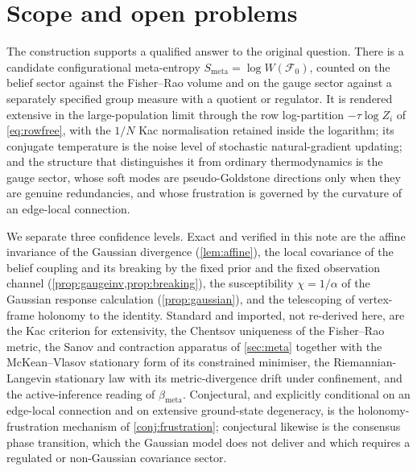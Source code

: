 \documentclass[11pt]{article}
\theoremstyle{plain}
\theoremstyle{definition}
\newcommand{\Fcal}{\mathcal{F}}
\newcommand{\Wmeta}{W}
\newcommand{\Smeta}{S_{\mathrm{meta}}}
\newcommand{\bmeta}{\beta_{\mathrm{meta}}}
\begin{document}
\section{Scope and open problems}
\label{sec:discussion}

The construction supports a qualified answer to the original question. There is a
candidate configurational meta-entropy $\Smeta=\log\Wmeta(\Fcal_0)$, counted on the
belief sector against the Fisher--Rao volume and on the gauge sector against a separately
specified group measure with a quotient or regulator. It is rendered extensive in the
large-population limit through the row log-partition $-\tau\log Z_i$ of \cref{eq:rowfree},
with the $1/N$ Kac normalisation retained inside the logarithm; its conjugate temperature
is the noise level of stochastic natural-gradient updating; and the structure that
distinguishes it from ordinary thermodynamics is the gauge sector, whose soft modes are
pseudo-Goldstone directions only when they are genuine redundancies, and whose frustration
is governed by the curvature of an edge-local connection.

We separate three confidence levels. Exact and verified in this note are the affine
invariance of the Gaussian divergence (\cref{lem:affine}), the local covariance of the
belief coupling and its breaking by the fixed prior and the fixed observation channel
(\cref{prop:gaugeinv,prop:breaking}), the susceptibility
$\chi=1/\alpha$ of the Gaussian response calculation (\cref{prop:gaussian}), and the
telescoping of vertex-frame holonomy to the identity. Standard and imported, not
re-derived here, are the Kac criterion for extensivity, the Chentsov uniqueness of the
Fisher--Rao metric, the Sanov and contraction apparatus of \cref{sec:meta} together with
the McKean--Vlasov stationary form of its constrained minimiser, the Riemannian-Langevin stationary law with its
metric-divergence drift under confinement, and the active-inference reading of $\bmeta$.
Conjectural, and explicitly conditional on an edge-local connection and on extensive
ground-state degeneracy, is the holonomy-frustration mechanism of
\cref{conj:frustration}; conjectural likewise is the consensus phase transition, which
the Gaussian model does not deliver and which requires a regulated or non-Gaussian
covariance sector.
\end{document}
